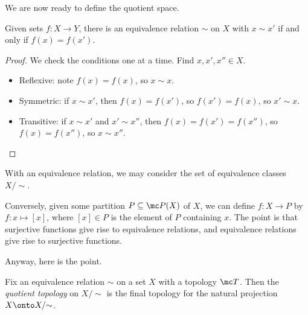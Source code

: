 \documentclass[../notes.tex]{subfiles}
\begin{document}
We are now ready to define the quotient space.
\begin{lemma}
	Given sets $f\colon X\to Y$, there is an equivalence relation $\sim$ on $X$ with $x\sim x'$ if and only if $f(x)=f(x')$.
\end{lemma}
\begin{proof}
	We check the conditions one at a time. Find $x,x',x''\in X$.
	\begin{itemize}
		\item Reflexive: note $f(x)=f(x)$, so $x\sim x$.
		\item Symmetric: if $x\sim x'$, then $f(x)=f(x')$, so $f(x')=f(x)$, so $x'\sim x$.
		\item Transitive: if $x\sim x'$ and $x'\sim x''$, then $f(x)=f(x')=f(x'')$, so $f(x)=f(x'')$, so $x\sim x''$.
		\qedhere
	\end{itemize}
\end{proof}
With an equivalence relation, we may consider the set of equivalence classes $X/{\sim}$.
\begin{remark}
	Conversely, given some partition $P\subseteq\mc P(X)$ of $X$, we can define $f\colon X\to P$ by $f\colon x\mapsto[x]$, where $[x]\in P$ is the element of $P$ containing $x$. The point is that surjective functions give rise to equivalence relations, and equivalence relations give rise to surjective functions.
\end{remark}
Anyway, here is the point.
\begin{definition}
	Fix an equivalence relation $\sim$ on a set $X$ with a topology $\mc T$. Then the \textit{quotient topology} on $X/{\sim}$ is the final topology for the natural projection $X\onto X/{\sim}$.
\end{definition}
\end{document}
